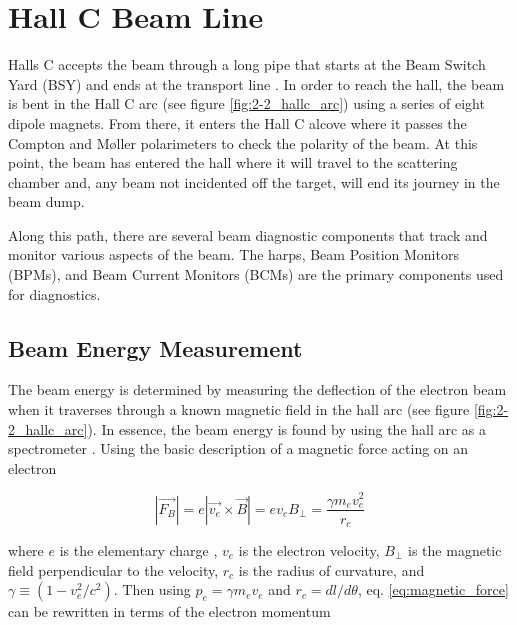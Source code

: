 \documentclass[
]{report}
\begin{document}
\hypertarget{Section-4.2}{%
\section{Hall C Beam Line}\label{Section-4.2}}

Halls C accepts the beam through a long pipe that starts at the Beam
Switch Yard (BSY) and ends at the transport line
\cite{sta_jeerson_2019}. In order to reach the hall, the beam is bent in
the Hall C arc (see figure \ref{fig:2-2_hallc_arc}) using a series of
eight dipole magnets. From there, it enters the Hall C alcove where it
passes the Compton and \(\text{M\o{}ller}\) polarimeters to check the
polarity of the beam. At this point, the beam has entered the hall where
it will travel to the scattering chamber and, any beam not incidented
off the target, will end its journey in the beam dump.



Along this path, there are several beam diagnostic components that track
and monitor various aspects of the beam. The harps, Beam Position
Monitors (BPMs), and Beam Current Monitors (BCMs) are the primary
components used for diagnostics.



\hypertarget{beam-energy-measurement}{%
\subsection{Beam Energy Measurement}\label{beam-energy-measurement}}

The beam energy is determined by measuring the deflection of the
electron beam when it traverses through a known magnetic field in the
hall arc (see figure \ref{fig:2-2_hallc_arc}). In essence, the beam
energy is found by using the hall arc as a spectrometer
\cite{yan_beam_1993}. Using the basic description of a magnetic force
acting on an electron

\begin{equation} 
  |\vec{F_{B}}|=e|\vec{v_e}\times\vec{B}|=ev_{e}B_{\perp}=\frac{\gamma m_{e}v^2_e}{r_c}
  \label{eq:magnetic_force} 
\end{equation}

where \(e\) is the elementary charge , \(v_e\) is the electron velocity,
\(B_{\perp}\) is the magnetic field perpendicular to the velocity,
\(r_c\) is the radius of curvature, and \(\gamma\equiv(1-v^2_e/c^2)\).
Then using \(p_e=\gamma m_e v_e\) and \(r_c=dl/d\theta\), eq.
\ref{eq:magnetic_force} can be rewritten in terms of the electron
momentum
\end{document}
